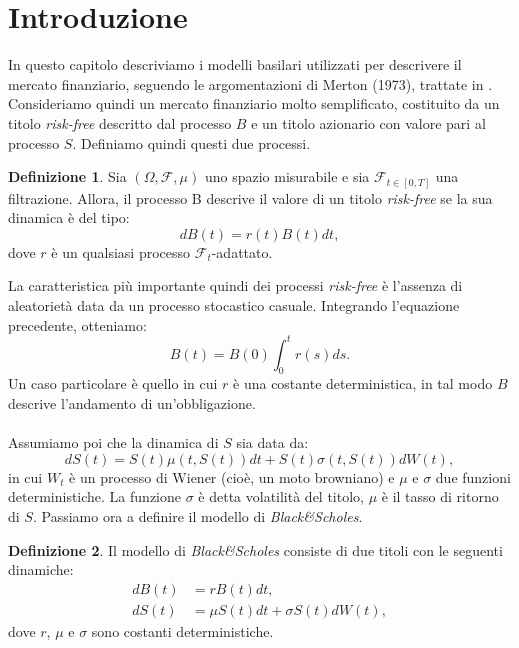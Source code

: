 \documentclass[a4paper,10pt]{report}
\theoremstyle{plain}
\theoremstyle{definition}
\newtheorem{definition}{Definizione}[chapter]
\theoremstyle{remark}
\newtheorem{osservazione}{Osservazione}[chapter]
\begin{document}
\section{Introduzione}
In questo capitolo descriviamo i modelli basilari utilizzati per descrivere il mercato finanziario, seguendo le argomentazioni di Merton (1973), trattate in \cite{bjork2009arbitrage}. Consideriamo quindi un mercato finanziario molto semplificato, costituito da un titolo \emph{risk-free} descritto dal processo $B$ e un titolo azionario con valore pari al processo $S$. Definiamo quindi questi due processi.
\begin{definition}
Sia $(\Omega,\mathcal{F},\mu)$ uno spazio misurabile e sia $\mathcal{F}_{t\in [ 0,T ]}$ una filtrazione. Allora, il processo B descrive il valore di un titolo \emph{risk-free} se la sua dinamica \`e del tipo: $$dB(t)=r(t)B(t)dt,$$dove $r$ \`e un qualsiasi processo $\mathcal{F}_t$-adattato.
\end{definition}
La caratteristica pi\`u importante quindi dei processi \emph{risk-free} \`e l'assenza di aleatoriet\`a data da un processo stocastico casuale. Integrando l'equazione precedente, otteniamo: $$B(t)=B(0)\int_0^tr(s)ds.$$ Un caso particolare \`e quello in cui $r$ \`e una costante deterministica, in tal modo $B$ descrive l'andamento di un'obbligazione.\\\\Assumiamo poi che la dinamica di $S$ sia data da: $$dS(t)=S(t)\mu(t,S(t))dt+S(t)\sigma(t,S(t))dW(t),$$ in cui $W_t$ \`e un processo di Wiener (cio\`e, un moto browniano) e $\mu$ e $\sigma$ due funzioni deterministiche. La funzione $\sigma$ \`e detta volatilit\`a del titolo, $\mu$ \`e il tasso di ritorno di $S$.
Passiamo ora a definire il modello di \emph{Black\&Scholes}.
\begin{definition}
Il modello di \emph{Black\&Scholes} consiste di due titoli con le seguenti dinamiche:
\begin{align*}
dB(t)&=rB(t)dt,\\
dS(t)&=\mu S(t)dt+\sigma S(t)dW(t),
\end{align*}
dove $r$, $\mu$ e $\sigma$ sono costanti deterministiche.
\end{definition}
\end{document}
